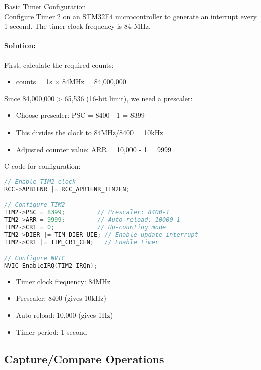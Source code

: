 \begin{example2}{Basic Timer Configuration}\\
Configure Timer 2 on an STM32F4 microcontroller to generate an interrupt every 1 second. The timer clock frequency is 84 MHz.

\tcblower
\paragraph{Solution:}
First, calculate the required counts:
\begin{itemize}
    \item counts = 1s × 84MHz = 84,000,000
\end{itemize}

Since 84,000,000 > 65,536 (16-bit limit), we need a prescaler:
\begin{itemize}
    \item Choose prescaler: PSC = 8400 - 1 = 8399
    \item This divides the clock to 84MHz/8400 = 10kHz
    \item Adjusted counter value: ARR = 10,000 - 1 = 9999
\end{itemize}

C code for configuration:
\begin{lstlisting}[language=C, style=basesmol]
// Enable TIM2 clock
RCC->APB1ENR |= RCC_APB1ENR_TIM2EN;

// Configure TIM2
TIM2->PSC = 8399;         // Prescaler: 8400-1
TIM2->ARR = 9999;         // Auto-reload: 10000-1
TIM2->CR1 = 0;            // Up-counting mode
TIM2->DIER |= TIM_DIER_UIE; // Enable update interrupt
TIM2->CR1 |= TIM_CR1_CEN;   // Enable timer

// Configure NVIC
NVIC_EnableIRQ(TIM2_IRQn);
\end{lstlisting}

\begin{itemize}
    \item Timer clock frequency: 84MHz
    \item Prescaler: 8400 (gives 10kHz)
    \item Auto-reload: 10,000 (gives 1Hz)
    \item Timer period: 1 second
\end{itemize}
\end{example2}

\subsection{Capture/Compare Operations}

